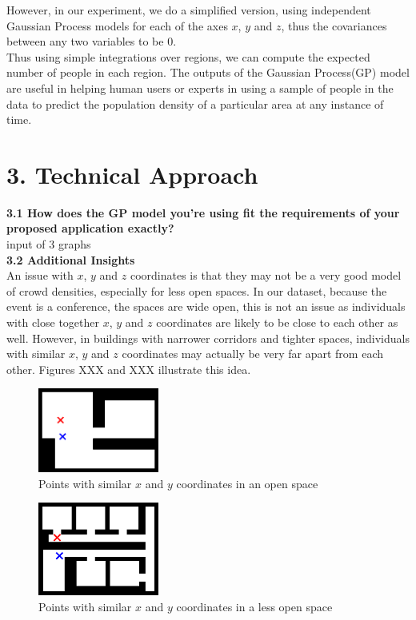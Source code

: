 \documentclass[letterpaper]{article}
\begin{document}
However, in our experiment, we do a simplified version, using independent Gaussian Process models for each of the axes $x$, $y$ and $z$, thus the covariances between any two variables to be $0$. \\

Thus using simple integrations over regions, we can compute the expected number of people in each region. The outputs of the Gaussian Process(GP) model are useful in helping human users or experts in using a sample of people in the data to predict the population density of a particular area at any instance of time.

\section{3.  Technical Approach}

{\bf3.1  How does the GP model you’re using fit the requirements of your proposed application exactly?} \\

input of 3 graphs \\

{\bf3.2  Additional Insights} \\

An issue with $x$, $y$ and $z$ coordinates is that they may not be a very good model of crowd densities, especially for less open spaces. 
In our dataset, because the event is a conference, the spaces are wide open, this is not an issue as individuals with close together $x$, $y$ and $z$ coordinates are likely to be close to each other as well. However, in buildings with narrower corridors and tighter spaces, individuals with similar $x$, $y$ and $z$ coordinates may actually be very far apart from each other. Figures XXX and XXX illustrate this idea.

\begin{figure}[h!]
  \centering
    \includegraphics[width=150px,natwidth=634,natheight=442]{openspace1.png}
  \caption{Points with similar $x$ and $y$ coordinates in an open space}
\end{figure}

\begin{figure}[h!]
  \centering
    \includegraphics[width=150px,natwidth=570,natheight=442]{openspace2.png}
  \caption{Points with similar $x$ and $y$ coordinates in a less open space}
\end{figure}
\end{document}
